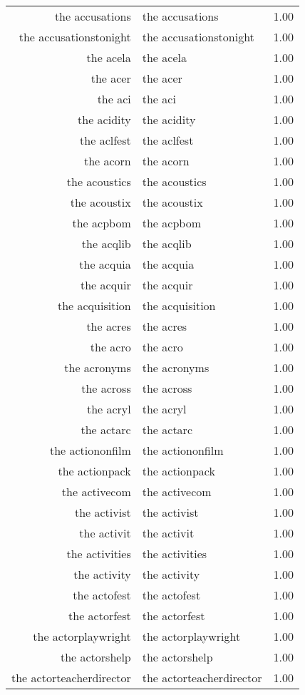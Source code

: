 \begin{table}[ht]
\begin{tabular}{rlr}
  the accusations & the accusations & 1.00 \\ 
  the accusationstonight & the accusationstonight & 1.00 \\ 
  the acela & the acela & 1.00 \\ 
  the acer & the acer & 1.00 \\ 
  the aci & the aci & 1.00 \\ 
  the acidity & the acidity & 1.00 \\ 
  the aclfest & the aclfest & 1.00 \\ 
  the acorn & the acorn & 1.00 \\ 
  the acoustics & the acoustics & 1.00 \\ 
  the acoustix & the acoustix & 1.00 \\ 
  the acpbom & the acpbom & 1.00 \\ 
  the acqlib & the acqlib & 1.00 \\ 
  the acquia & the acquia & 1.00 \\ 
  the acquir & the acquir & 1.00 \\ 
  the acquisition & the acquisition & 1.00 \\ 
  the acres & the acres & 1.00 \\ 
  the acro & the acro & 1.00 \\ 
  the acronyms & the acronyms & 1.00 \\ 
  the across & the across & 1.00 \\ 
  the acryl & the acryl & 1.00 \\ 
  the actarc & the actarc & 1.00 \\ 
  the actiononfilm & the actiononfilm & 1.00 \\ 
  the actionpack & the actionpack & 1.00 \\ 
  the activecom & the activecom & 1.00 \\ 
  the activist & the activist & 1.00 \\ 
  the activit & the activit & 1.00 \\ 
  the activities & the activities & 1.00 \\ 
  the activity & the activity & 1.00 \\ 
  the actofest & the actofest & 1.00 \\ 
  the actorfest & the actorfest & 1.00 \\ 
  the actorplaywright & the actorplaywright & 1.00 \\ 
  the actorshelp & the actorshelp & 1.00 \\ 
  the actorteacherdirector & the actorteacherdirector & 1.00 \\ 

\end{tabular}
\end{table}
